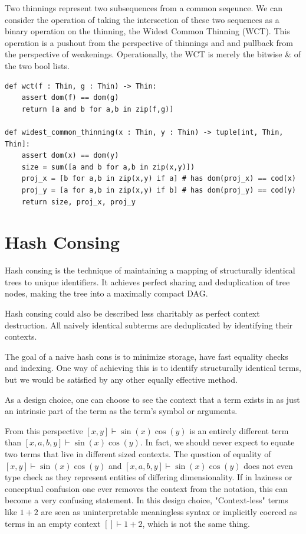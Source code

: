 \documentclass{article}%
\begin{document}

Two thinnings represent two subsequences from a common seqeunce. We can consider the operation of taking the intersection of these two sequences as a binary operation on the thinning, the Widest Common Thinning (WCT). This operation is a pushout from the perspective of thinnings and and pullback from the perspective of weakenings. Operationally, the WCT is merely the bitwise \& of the two bool lists.

\begin{lstlisting}
def wct(f : Thin, g : Thin) -> Thin:
    assert dom(f) == dom(g)
    return [a and b for a,b in zip(f,g)]

def widest_common_thinning(x : Thin, y : Thin) -> tuple[int, Thin, Thin]:
    assert dom(x) == dom(y)
    size = sum([a and b for a,b in zip(x,y)])
    proj_x = [b for a,b in zip(x,y) if a] # has dom(proj_x) == cod(x)
    proj_y = [a for a,b in zip(x,y) if b] # has dom(proj_y) == cod(y)
    return size, proj_x, proj_y
\end{lstlisting}



\section{Hash Consing}

Hash consing is the technique of maintaining a mapping of structurally identical trees to unique identifiers. It achieves perfect sharing and deduplication of tree nodes, making the tree into a maximally compact DAG.

Hash consing could also be described less charitably as perfect context destruction. All naively identical subterms are deduplicated by identifying their contexts.

The goal of a naive hash cons is to minimize storage, have fast equality checks and indexing. One way of achieving this is to identify structurally identical terms, but we would be satisfied by any other equally effective method.

As a design choice, one can choose to see the context that a term exists in as just an intrinsic part of the term as the term's symbol or arguments.

From this perspective $[x,y] \vdash \sin(x)\cos(y)$ is an entirely different term than $ [x,a,b,y] \vdash \sin(x)\cos(y) $. In fact, we should never expect to equate two terms that live in different sized contexts. The question of equality of $[x,y] \vdash \sin(x)\cos(y)$ and $ [x,a,b,y] \vdash \sin(x)\cos(y) $ does not even type check as they represent entities of differing dimensionality. If in laziness or conceptual confusion one ever removes the context from the notation, this can become a very confusing statement. In this design choice, "Context-less" terms like $1 + 2$ are seen as uninterpretable meaningless syntax or implicitly coerced as terms in an empty context $[] \vdash 1 + 2$, which is not the same thing.
\end{document}
